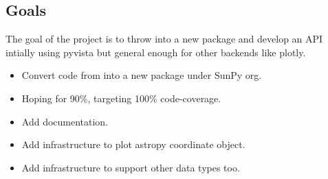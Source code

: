 \subsection{Goals}
    The goal of the project is to throw \pr into a new package and develop an API intially using pyvista but general enough for other backends like plotly.
    \begin{itemize}
        \item Convert code from \pr into a new package under SunPy org.
        \item Hoping for 90\%, targeting 100\% code-coverage.
        \item Add documentation.
        \item Add infrastructure to plot astropy coordinate object.
        \item Add infrastructure to support other data types too.
    \end{itemize}
